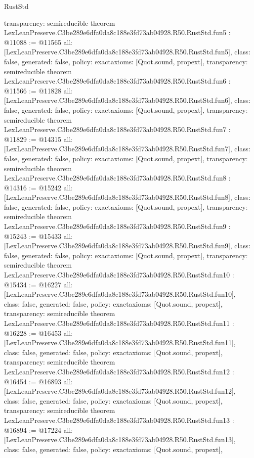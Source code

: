 \begin{lexlean}{RustStd}
\begin{coremodule}
{  transparency: semireducible
}
theorem LexLeanPreserve.C3be289e6dfa0da8c188e3fd73ab04928.R50.RustStd.fun5 : @11088 := @11565 {
  all: [LexLeanPreserve.C3be289e6dfa0da8c188e3fd73ab04928.R50.RustStd.fun5],
  class: false,
  generated: false,
  policy: exact{axioms: [Quot.sound, propext]},
  transparency: semireducible
}
theorem LexLeanPreserve.C3be289e6dfa0da8c188e3fd73ab04928.R50.RustStd.fun6 : @11566 := @11828 {
  all: [LexLeanPreserve.C3be289e6dfa0da8c188e3fd73ab04928.R50.RustStd.fun6],
  class: false,
  generated: false,
  policy: exact{axioms: [Quot.sound, propext]},
  transparency: semireducible
}
theorem LexLeanPreserve.C3be289e6dfa0da8c188e3fd73ab04928.R50.RustStd.fun7 : @11829 := @14315 {
  all: [LexLeanPreserve.C3be289e6dfa0da8c188e3fd73ab04928.R50.RustStd.fun7],
  class: false,
  generated: false,
  policy: exact{axioms: [Quot.sound, propext]},
  transparency: semireducible
}
theorem LexLeanPreserve.C3be289e6dfa0da8c188e3fd73ab04928.R50.RustStd.fun8 : @14316 := @15242 {
  all: [LexLeanPreserve.C3be289e6dfa0da8c188e3fd73ab04928.R50.RustStd.fun8],
  class: false,
  generated: false,
  policy: exact{axioms: [Quot.sound, propext]},
  transparency: semireducible
}
theorem LexLeanPreserve.C3be289e6dfa0da8c188e3fd73ab04928.R50.RustStd.fun9 : @15243 := @15433 {
  all: [LexLeanPreserve.C3be289e6dfa0da8c188e3fd73ab04928.R50.RustStd.fun9],
  class: false,
  generated: false,
  policy: exact{axioms: [Quot.sound, propext]},
  transparency: semireducible
}
theorem LexLeanPreserve.C3be289e6dfa0da8c188e3fd73ab04928.R50.RustStd.fun10 : @15434 := @16227 {
  all: [LexLeanPreserve.C3be289e6dfa0da8c188e3fd73ab04928.R50.RustStd.fun10],
  class: false,
  generated: false,
  policy: exact{axioms: [Quot.sound, propext]},
  transparency: semireducible
}
theorem LexLeanPreserve.C3be289e6dfa0da8c188e3fd73ab04928.R50.RustStd.fun11 : @16228 := @16453 {
  all: [LexLeanPreserve.C3be289e6dfa0da8c188e3fd73ab04928.R50.RustStd.fun11],
  class: false,
  generated: false,
  policy: exact{axioms: [Quot.sound, propext]},
  transparency: semireducible
}
theorem LexLeanPreserve.C3be289e6dfa0da8c188e3fd73ab04928.R50.RustStd.fun12 : @16454 := @16893 {
  all: [LexLeanPreserve.C3be289e6dfa0da8c188e3fd73ab04928.R50.RustStd.fun12],
  class: false,
  generated: false,
  policy: exact{axioms: [Quot.sound, propext]},
  transparency: semireducible
}
theorem LexLeanPreserve.C3be289e6dfa0da8c188e3fd73ab04928.R50.RustStd.fun13 : @16894 := @17224 {
  all: [LexLeanPreserve.C3be289e6dfa0da8c188e3fd73ab04928.R50.RustStd.fun13],
  class: false,
  generated: false,
  policy: exact{axioms: [Quot.sound, propext]},
}
\end{coremodule}
\end{lexlean}
